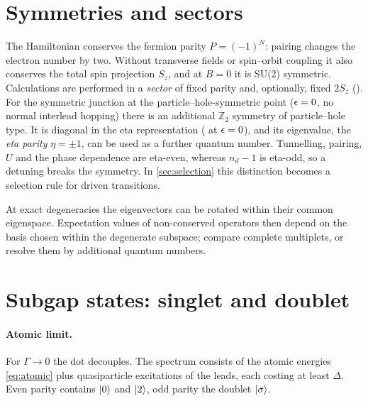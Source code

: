 \section{Symmetries and sectors}\label{sec:symmetries}

The Hamiltonian conserves the fermion parity $P=(-1)^N$: pairing changes the electron
number by two. Without transverse fields or spin--orbit coupling it also conserves the
total spin projection $S_z$, and at $B=0$ it is SU(2) symmetric. Calculations are performed in a
\emph{sector} of fixed parity and, optionally, fixed $2S_z$ ().
For the symmetric junction at the particle--hole-symmetric point ($\epsilon=0$, no normal
interlead hopping) there is an additional $\mathbb Z_2$ symmetry of particle--hole type.
It is diagonal in the eta representation ( at $\epsilon=0$),
and its eigenvalue, the \emph{eta parity} $\eta=\pm1$, can be used as a further
quantum number. Tunnelling, pairing, $U$ and
the phase dependence are eta-even, whereas $n_d-1$ is eta-odd, so a detuning breaks the
symmetry. In \cref{sec:selection} this distinction becomes a selection rule for driven
transitions.

\begin{caution}
At exact degeneracies the eigenvectors can be rotated within their common eigenspace. Expectation values of
non-conserved operators then depend on the basis chosen within the degenerate subspace;
compare complete multiplets, or resolve them by additional quantum numbers.
\end{caution}

\section{Subgap states: singlet and doublet}\label{sec:subgap}

\paragraph{Atomic limit.}
For $\Gamma\to0$ the dot decouples. The spectrum consists of the atomic energies
\eqref{eq:atomic} plus quasiparticle excitations of the leads, each costing at least $\Delta$. Even parity
contains $\lvert 0\rangle$ and $\lvert 2\rangle$, odd parity the doublet $\lvert \sigma\rangle$.

